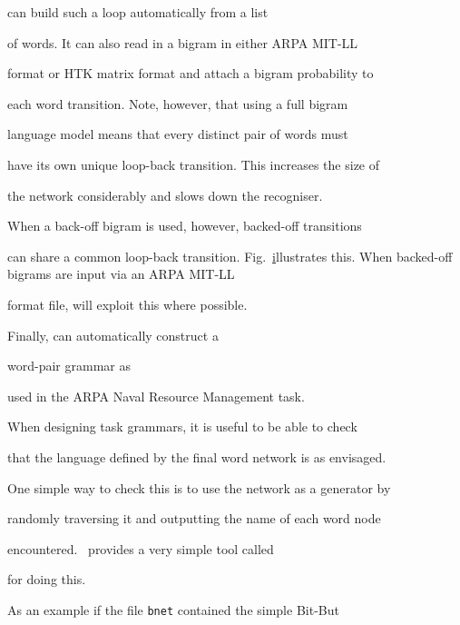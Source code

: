  can build such a loop automatically from a list


of words.  It can also read in a bigram in either ARPA MIT-LL 


format or HTK matrix format and attach a bigram probability to


each word transition.  Note, however, that using a full bigram


language model means that every distinct pair of words must


have its own unique loop-back transition.  This increases the size of


the network considerably and slows down the recogniser.


When a back-off bigram is used, however, backed-off transitions


can share a common loop-back transition.  Fig.~\href{f:bobig}


illustrates this.  When backed-off bigrams are input via an ARPA MIT-LL 


format file,  will exploit this where possible.





Finally,  can automatically construct a 


word-pair grammar as 


used in the ARPA Naval Resource Management task.













When designing task grammars, it is useful to be able to check


that the  language defined by the final word network is as envisaged.


One simple way to check this is to use the network as a generator by


randomly traversing it and outputting the name of each word node


encountered.  \HTK\ provides a very simple tool called 




for doing this.





As an example if the file \texttt{bnet} contained the simple Bit-But



